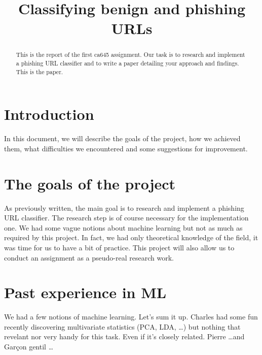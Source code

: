 \documentclass[conference,11pt]{IEEEtran}
\begin{document}
\title{Classifying benign and phishing URLs}

\author{
\and
{}
\and
{}
}

\maketitle

\begin{abstract}
This is the report of the first ca645 assignment. Our task is to research and
implement a phishing URL classifier and to write a paper detailing your approach
and findings. This is the paper.
\end{abstract}

\section{Introduction}
In this document, we will describe the goals of the project, how we achieved
them, what difficulties we encountered and some suggestions for improvement.

\section{The goals of the project}
As previously written, the main goal is to research and implement a phishing URL
classifier. The research step is of course necessary for the implementation one.
We had some vague notions about machine learning but not as much as required by
this project. In fact, we had only theoretical knowledge of the field, it was
time for us to have a bit of practice. This project will also allow us to
conduct an assignment as a pseudo-real research work.

\section{Past experience in ML}
We had a few notions of machine learning. Let's sum it up. Charles had some fun
recently discovering multivariate statistics (PCA, LDA, \ldots) but nothing that
revelant nor very handy for this task. Even if it's closely related. Pierre
\ldots and Garçon gentil \ldots
\end{document}
